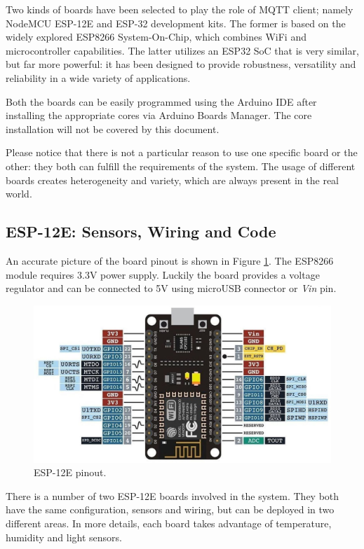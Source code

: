 Two kinds of boards have been selected to play the role of MQTT client; namely NodeMCU ESP-12E and ESP-32 development kits. The former is based on the widely explored ESP8266 System-On-Chip, which combines WiFi and microcontroller capabilities. The latter utilizes an ESP32 SoC that is very similar, but far more powerful: it has been designed to provide robustness, versatility and reliability in a wide variety of applications.

Both the boards can be easily programmed using the Arduino IDE after installing the appropriate cores via Arduino Boards Manager. The core installation will not be covered by this document.

Please notice that there is not a particular reason to use one specific board or the other: they both can fulfill the requirements of the system. The usage of different boards creates heterogeneity and variety, which are always present in the real world. 

\subsection{ESP-12E: Sensors, Wiring and Code}
\label{esp12_getting_started}
An accurate picture of the board pinout is shown in Figure \ref{esp12_pinout}. The ESP8266 module requires 3.3V power supply. Luckily the board provides a voltage regulator and can be connected to 5V using microUSB connector or \textit{Vin} pin.

\begin{figure}[H]
	\begin{center}
		\includegraphics[width=\textwidth]{./pictures/ESP-12E_pinout.JPG}
		\caption{ESP-12E pinout.}
		\label{esp12_pinout}
	\end{center}
\end{figure}

\noindent
There is a number of two ESP-12E boards involved in the system. They both have the same configuration, sensors and wiring, but can be deployed in two different areas.
In more details, each board takes advantage of temperature, humidity and light sensors.


